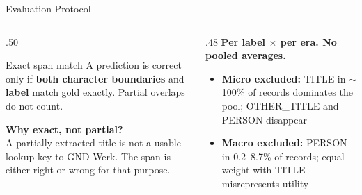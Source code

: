 \documentclass[xcolor,aspectratio=169,compress]{beamer}
\begin{document}
\begin{frame}{Evaluation Protocol}
  \small
  \begin{columns}
    \begin{column}{.50\textwidth}
      \begin{block}{Exact span match}
        A prediction is correct only if \textbf{both character boundaries} and \textbf{label} match gold exactly.
        Partial overlaps do not count.
      \end{block}
      \smallskip
      \textbf{Why exact, not partial?} \\
      A partially extracted title is not a usable lookup key to GND Werk. The span is either right or wrong for that purpose.

    \end{column}
    \begin{column}{.48\textwidth}
      \textbf{Per label $\times$ per era. No pooled averages.}
      \begin{itemize}\setlength{\itemsep}{3pt}
        \item \textbf{Micro excluded:} TITLE in $\sim$100\% of records dominates the pool; OTHER\_TITLE and PERSON disappear
        \item \textbf{Macro excluded:} PERSON in 0.2--8.7\% of records; equal weight with TITLE misrepresents utility
      \end{itemize}
    \end{column}
  \end{columns}
\end{frame}
\end{document}
